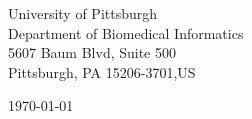 \begin{minipage}{0.49\textwidth}
    \begin{flushleft}
    \noindent
    University of Pittsburgh\\
    Department of Biomedical Informatics\\
    5607 Baum Blvd, Suite 500\\
    Pittsburgh, PA 15206-3701,US
    \end{flushleft}
    \end{minipage}
    \begin{minipage}{0.47\textwidth}
    \begin{flushright}
    \today
    \end{flushright}
    \end{minipage} \\
    
    \newcommand{\univ}{University of Pittsburgh}
    \newcommand{\univshort}{Pitt}
    \newcommand{\degree}{Ph.D.}
    \newcommand{\dept}{Biomedical Informatics}